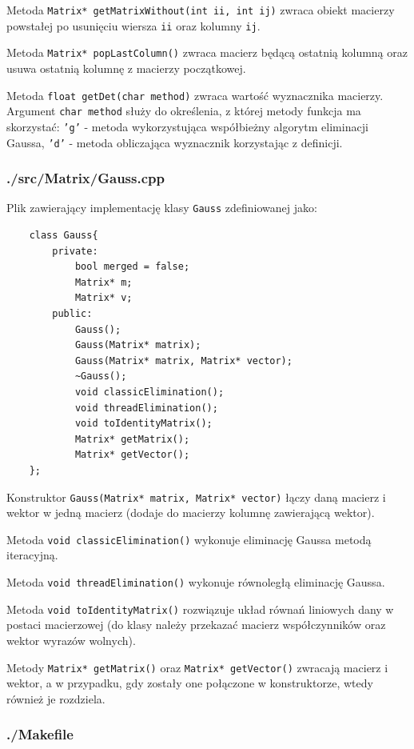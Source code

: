 \documentclass{article}
\begin{document}
Metoda \texttt{Matrix* getMatrixWithout(int ii, int ij)} zwraca obiekt macierzy powstałej po usunięciu wiersza \texttt{ii} oraz kolumny \texttt{ij}.

Metoda \texttt{Matrix* popLastColumn()} zwraca macierz będącą ostatnią kolumną oraz usuwa ostatnią kolumnę z macierzy początkowej.

Metoda \texttt{float getDet(char method)} zwraca wartość wyznacznika macierzy. Argument \texttt{char method} służy do określenia, z której metody funkcja ma skorzystać: \texttt{'g'} - metoda wykorzystująca współbieżny algorytm eliminacji Gaussa, \texttt{'d'} - metoda obliczająca wyznacznik korzystając z definicji.

\subsubsection{./src/Matrix/Gauss.cpp}

Plik zawierający implementację klasy \texttt{Gauss} zdefiniowanej jako:

\begin{verbatim}
    class Gauss{
        private:
            bool merged = false;
            Matrix* m;
            Matrix* v;
        public:
            Gauss();
            Gauss(Matrix* matrix);
            Gauss(Matrix* matrix, Matrix* vector);
            ~Gauss();
            void classicElimination();
            void threadElimination();
            void toIdentityMatrix();
            Matrix* getMatrix();
            Matrix* getVector();
    };
\end{verbatim}

Konstruktor \texttt{Gauss(Matrix* matrix, Matrix* vector)} łączy daną macierz i wektor w jedną macierz (dodaje do macierzy kolumnę zawierającą wektor).

Metoda \texttt{void classicElimination()} wykonuje eliminację Gaussa metodą iteracyjną.

Metoda \texttt{void threadElimination()} wykonuje równoległą eliminację Gaussa.

Metoda \texttt{void toIdentityMatrix()} rozwiązuje układ równań liniowych dany w postaci macierzowej (do klasy należy przekazać macierz współczynników oraz wektor wyrazów wolnych).

Metody \texttt{Matrix* getMatrix()} oraz \texttt{Matrix* getVector()} zwracają macierz i wektor, a w przypadku, gdy zostały one połączone w konstruktorze, wtedy również je rozdziela.

\subsubsection{./Makefile}
\end{document}
